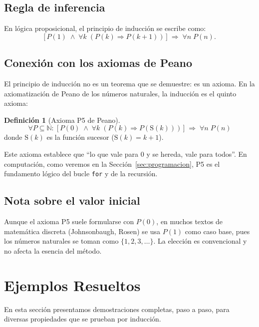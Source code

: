 \documentclass[11pt,a4paper]{article}
\theoremstyle{definition}
\newtheorem{definicion}{Definici\'on}[section]
\theoremstyle{plain}
\theoremstyle{definition}
\theoremstyle{definition}
\theoremstyle{remark}
\newcommand{\N}{\mathbb{N}}               %
\newcommand{\implica}{\Rightarrow}         %
\newcommand{\para}{\forall}               %
\begin{document}
\subsection*{Regla de inferencia}

En l\'ogica proposicional, el principio de inducci\'on se escribe como:
\[
\bigl[\,P(1) \;\wedge\; \para k\;(P(k) \implica P(k+1))\,\bigr]
\;\implica\; \para n\; P(n).
\]

\subsection*{Conexi\'on con los axiomas de Peano}

El principio de inducci\'on no es un teorema que se demuestre: es un axioma.
En la axiomatizaci\'on de Peano de los n\'umeros naturales, la inducci\'on es
el quinto axioma:

\begin{definicion}[Axioma P5 de Peano]
\label{def:p5}
\[
\para P\subseteq\N:\;
\bigl[\,P(0) \;\wedge\; \para k\;(P(k) \implica P(\text{S}(k)))\,\bigr]
\;\implica\; \para n\; P(n)
\]
donde $\text{S}(k)$ es la funci\'on sucesor ($\text{S}(k)=k+1$).
\end{definicion}

Este axioma establece que \enquote{lo que vale para $0$ y se hereda, vale para
todos}. En computaci\'on, como veremos en la Secci\'on~\ref{sec:programacion},
P5 es el fundamento l\'ogico del bucle \texttt{for} y de la recursi\'on.

\subsection*{Nota sobre el valor inicial}

Aunque el axioma P5 suele formularse con $P(0)$, en muchos textos de matem\'atica
discreta (Johnsonbaugh, Rosen) se usa $P(1)$ como caso base, pues los n\'umeros
naturales se toman como $\{1,2,3,\dots\}$. La elecci\'on es convencional y no
afecta la esencia del m\'etodo.

\section{Ejemplos Resueltos}

En esta secci\'on presentamos demostraciones completas, paso a paso, para
diversas propiedades que se prueban por inducci\'on.
\end{document}
